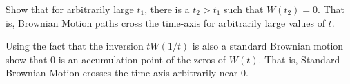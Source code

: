 \begin{problem}
 Show that for arbitrarily large $t_1$, there is a $t_2>t_1$
  such that $W(t_2)=0$. That is, Brownian Motion paths cross the time-axis for
  arbitrarily large values of $t$.

\begin{sol}

\end{sol}
\end{problem}

\begin{problem}
 Using the fact that the inversion $t W(1/t)$ is also a standard
  Brownian motion show that $0$ is an accumulation  point of the zeros of $W(t)$.
  That is, Standard Brownian Motion crosses the time axis arbitrarily near $0$.

\begin{sol}

\end{sol}
\end{problem}

